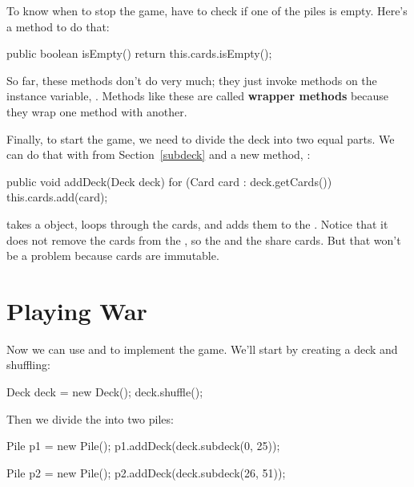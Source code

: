 To know when to stop the game, have to check if one of the piles is empty.
Here's a method to do that: 

\begin{code}
public boolean isEmpty() {
    return this.cards.isEmpty();
}
\end{code}

So far, these methods don't do very much; they just invoke methods on the instance variable, .
Methods like these are called {\bf wrapper methods} because they wrap one method with another.



Finally, to start the game, we need to divide the deck into two equal parts.
We can do that with  from Section~\ref{subdeck} and a new method, :

\begin{code}
public void addDeck(Deck deck) {
    for (Card card : deck.getCards()) {
        this.cards.add(card);
    }
}
\end{code}

 takes a  object, loops through the cards, and adds them to the .
Notice that it does not remove the cards from the , so the  and the  share cards.
But that won't be a problem because cards are immutable.


\section{Playing War}

Now we can use  and  to implement the game.
We'll start by creating a deck and shuffling:

\begin{code}
Deck deck = new Deck();
deck.shuffle();
\end{code}

Then we divide the  into two piles:

\begin{code}
Pile p1 = new Pile();
p1.addDeck(deck.subdeck(0, 25));

Pile p2 = new Pile();
p2.addDeck(deck.subdeck(26, 51));
\end{code}

